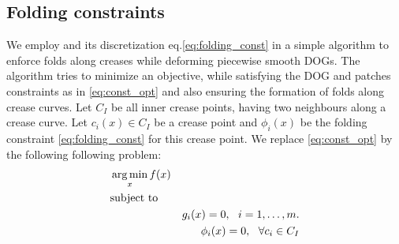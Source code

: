 \subsection{Folding constraints}
We employ  and its discretization eq.\eqref{eq:folding_const} in a simple algorithm to enforce folds along creases while deforming piecewise smooth DOGs. The algorithm tries to minimize an objective, while satisfying the DOG and patches constraints as in \eqref{eq:const_opt} and also ensuring the formation of folds along crease curves. Let $C_{I}$ be all inner crease points, having two neighbours along a crease curve. Let $c_i(x) \in C_{I}$ be a crease point and $\phi_i(x) $ be the folding constraint \eqref{eq:folding_const} for this crease point. We replace \eqref{eq:const_opt} by the following following problem:
\begin{equation} \label{eq:const_opt}
\begin{aligned}
& \operatorname*{arg\,min}_x
f(x) \\
& \textrm{subject to} \\
& & g_i(x) = 0, \ \  i = 1, \ldots, m. \\
& & \phi_i(x) = 0, \ \  \forall c_i \in C_{I}
\end{aligned}
\end{equation}

